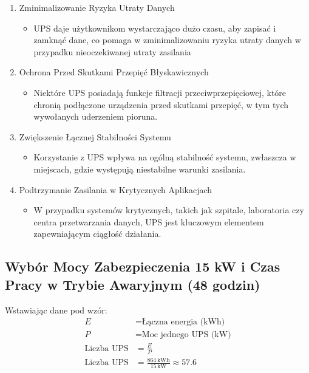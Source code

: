 \begin{enumerate}
    \item Zminimalizowanie Ryzyka Utraty Danych
        \begin{itemize}
            \item UPS daje użytkownikom wystarczająco dużo czasu, aby zapisać i zamknąć dane, co pomaga w zminimalizowaniu ryzyka utraty danych w przypadku nieoczekiwanej utraty zasilania
        \end{itemize}
    
    \item Ochrona Przed Skutkami Przepięć Błyskawicznych
        \begin{itemize}
            \item Niektóre UPS posiadają funkcje filtracji przeciwprzepięciowej, które chronią podłączone urządzenia przed skutkami przepięć, w tym tych wywołanych uderzeniem pioruna.
        \end{itemize}

    
    \item Zwiększenie Łącznej Stabilności Systemu
    \begin{itemize}
        \item Korzystanie z UPS wpływa na ogólną stabilność systemu, zwłaszcza w miejscach, gdzie występują niestabilne warunki zasilania.
    \end{itemize}
    
    \item Podtrzymanie Zasilania w Krytycznych Aplikacjach
    \begin{itemize}
        \item W przypadku systemów krytycznych, takich jak szpitale, laboratoria czy centra przetwarzania danych, UPS jest kluczowym elementem zapewniającym ciągłość działania.
    \end{itemize}
\end{enumerate}

\pagebreak

\subsection{Wybór Mocy Zabezpieczenia 15 kW i Czas Pracy w Trybie Awaryjnym (48 godzin)}


Wstawiając dane pod wzór: 
\begin{align*}
    E & = \text{Łączna energia (kWh)} \\
    P & = \text{Moc jednego UPS (kW)} \\
    \text{Liczba UPS} & = \frac{E}{P} \\
    \text{Liczba UPS} & = \frac{864 \, \text{kWh}}{15 \, \text{kW}} \approx 57.6
\end{align*}


